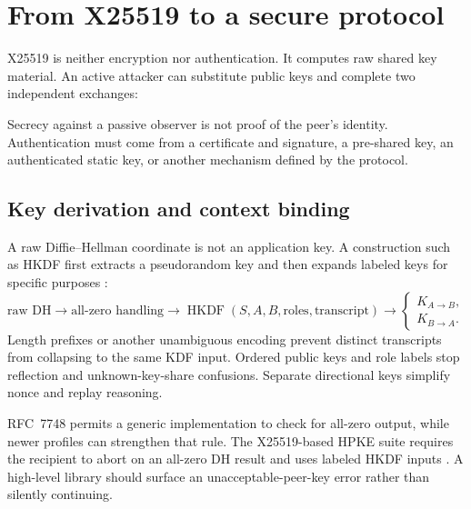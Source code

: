 \section{From X25519 to a secure protocol}

X25519 is neither encryption nor authentication. It computes raw shared key
material. An active attacker can substitute public keys and complete two
independent exchanges:

\begin{center}
\end{center}

Secrecy against a passive observer is not proof of the peer's identity.
Authentication must come from a certificate and signature, a pre-shared key,
an authenticated static key, or another mechanism defined by the protocol.

\subsection{Key derivation and context binding}

A raw Diffie--Hellman coordinate is not an application key. A construction
such as HKDF first extracts a pseudorandom key and then expands labeled keys
for specific purposes \cite{rfc5869}:
\[
  \text{raw DH}
  \longrightarrow
  \text{all-zero handling}
  \longrightarrow
  \operatorname{HKDF}(S,A,B,\text{roles},\text{transcript})
  \longrightarrow
  \begin{cases}
  K_{A\to B},\\
  K_{B\to A}.
  \end{cases}
\]
Length prefixes or another unambiguous encoding prevent distinct transcripts
from collapsing to the same KDF input. Ordered public keys and role labels stop
reflection and unknown-key-share confusions. Separate directional keys simplify
nonce and replay reasoning.

RFC~7748 permits a generic implementation to check for all-zero output, while
newer profiles can strengthen that rule. The X25519-based HPKE suite requires
the recipient to abort on an all-zero DH result and uses labeled HKDF inputs
\cite{rfc9180}. A high-level library should surface an unacceptable-peer-key
error rather than silently continuing.

